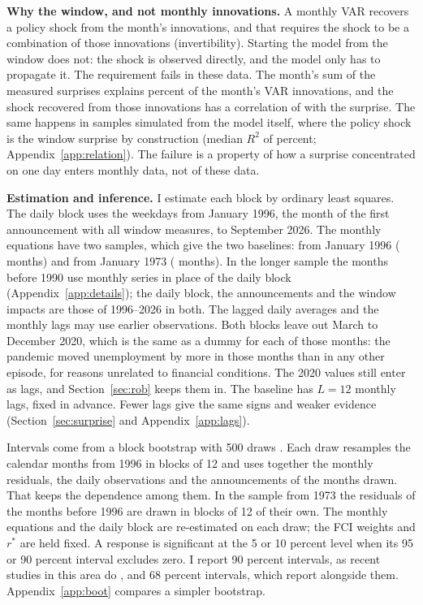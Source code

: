 \documentclass[11pt]{article}
\newcommand{\rs}{r^{*}}
\begin{document}
\textbf{Why the window, and not monthly innovations.} A monthly VAR recovers a policy shock from the month's innovations, and that requires the shock to be a combination of those innovations (invertibility). Starting the model from the window does not: the shock is observed directly, and the model only has to propagate it. The requirement fails in these data. The month's sum of the measured surprises explains  percent of the month's VAR innovations, and the shock recovered from those innovations has a correlation of  with the surprise. The same happens in samples simulated from the model itself, where the policy shock is the window surprise by construction (median $R^2$ of  percent; Appendix~\ref{app:relation}). The failure is a property of how a surprise concentrated on one day enters monthly data, not of these data.

\textbf{Estimation and inference.} I estimate each block by ordinary least squares. The daily block uses the weekdays from January 1996, the month of the first announcement with all window measures, to September 2026. The monthly equations have two samples, which give the two baselines: from January 1996 ( months) and from January 1973 ( months). In the longer sample the months before 1990 use monthly series in place of the daily block (Appendix~\ref{app:details}); the daily block, the announcements and the window impacts are those of 1996--2026 in both. The lagged daily averages and the monthly lags may use earlier observations. Both blocks leave out March to December 2020, which is the same as a dummy for each of those months: the pandemic moved unemployment by more in those months than in any other episode, for reasons unrelated to financial conditions. The 2020 values still enter as lags, and Section~\ref{sec:rob} keeps them in. The baseline has $L=12$ monthly lags, fixed in advance. Fewer lags give the same signs and weaker evidence (Section~\ref{sec:surprise} and Appendix~\ref{app:lags}).

Intervals come from a block bootstrap with 500 draws \citep{kunsch1989,jentsch2019}. Each draw resamples the calendar months from 1996 in blocks of 12 and uses together the monthly residuals, the daily observations and the announcements of the months drawn. That keeps the dependence among them. In the sample from 1973 the residuals of the months before 1996 are drawn in blocks of 12 of their own. The monthly equations and the daily block are re-estimated on each draw; the FCI weights and $\rs$ are held fixed. A response is significant at the 5 or 10 percent level when its 95 or 90 percent interval excludes zero. I report 90 percent intervals, as recent studies in this area do \citep{bauer2023,caldara2019,miranda2021,ramey2016}, and 68 percent intervals, which \citet{jarocinski2020} report alongside them. Appendix~\ref{app:boot} compares a simpler bootstrap.
\end{document}
